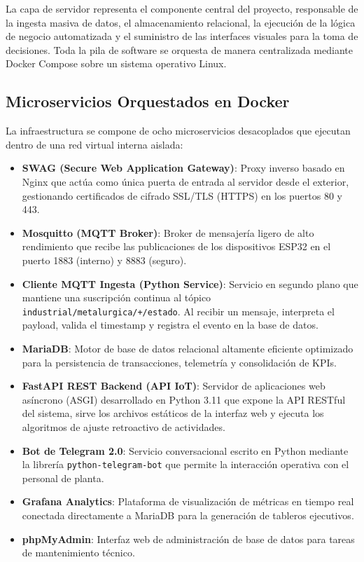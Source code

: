 \documentclass[11pt,a4paper]{article}
\begin{document}
La capa de servidor representa el componente central del proyecto, responsable de la ingesta masiva de datos, el almacenamiento relacional, la ejecución de la lógica de negocio automatizada y el suministro de las interfaces visuales para la toma de decisiones. Toda la pila de software se orquesta de manera centralizada mediante Docker Compose sobre un sistema operativo Linux.

\subsection{Microservicios Orquestados en Docker}

La infraestructura se compone de ocho microservicios desacoplados que ejecutan dentro de una red virtual interna aislada:
\begin{itemize}
    \item \textbf{SWAG (Secure Web Application Gateway)}: Proxy inverso basado en Nginx que actúa como única puerta de entrada al servidor desde el exterior, gestionando certificados de cifrado SSL/TLS (HTTPS) en los puertos 80 y 443.
    \item \textbf{Mosquitto (MQTT Broker)}: Broker de mensajería ligero de alto rendimiento que recibe las publicaciones de los dispositivos ESP32 en el puerto 1883 (interno) y 8883 (seguro).
    \item \textbf{Cliente MQTT Ingesta (Python Service)}: Servicio en segundo plano que mantiene una suscripción continua al tópico \texttt{industrial/metalurgica/+/estado}. Al recibir un mensaje, interpreta el payload, valida el timestamp y registra el evento en la base de datos.
    \item \textbf{MariaDB}: Motor de base de datos relacional altamente eficiente optimizado para la persistencia de transacciones, telemetría y consolidación de KPIs.
    \item \textbf{FastAPI REST Backend (API IoT)}: Servidor de aplicaciones web asíncrono (ASGI) desarrollado en Python 3.11 que expone la API RESTful del sistema, sirve los archivos estáticos de la interfaz web y ejecuta los algoritmos de ajuste retroactivo de actividades.
    \item \textbf{Bot de Telegram 2.0}: Servicio conversacional escrito en Python mediante la librería \texttt{python-telegram-bot} que permite la interacción operativa con el personal de planta.
    \item \textbf{Grafana Analytics}: Plataforma de visualización de métricas en tiempo real conectada directamente a MariaDB para la generación de tableros ejecutivos.
    \item \textbf{phpMyAdmin}: Interfaz web de administración de base de datos para tareas de mantenimiento técnico.
\end{itemize}
\end{document}
